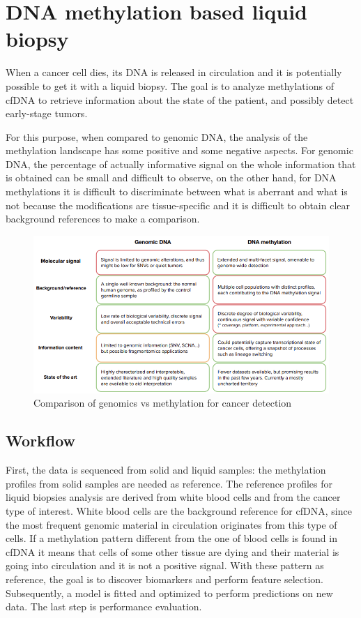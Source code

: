 \section{DNA methylation based liquid biopsy}

When a cancer cell dies, its DNA is released in circulation and it is
potentially possible to get it with a liquid biopsy. The goal is to analyze
methylations of cfDNA to retrieve information about the state of the patient,
and possibly detect early-stage tumors.

For this purpose, when compared to genomic DNA, the analysis of the methylation
landscape has some positive and some negative aspects. For genomic DNA, the
percentage of actually informative signal on the whole information that is
obtained can be small and difficult to observe, on the other hand, for DNA
methylations it is difficult to discriminate between what is aberrant and what
is not because the modifications are tissue-specific and it is difficult to
obtain clear background references to make a comparison.

\begin{figure}[!ht]
\centering
    \includegraphics[width=\linewidth]{comp.png}
    \caption{\label{fig:comp}Comparison of genomics vs methylation for cancer
    detection}
\end{figure}

\subsection{Workflow}

First, the data is sequenced from solid and liquid samples: the methylation
profiles from solid samples are needed as reference. The reference profiles for
liquid biopsies analysis are derived from white blood cells and from the cancer
type of interest. White blood cells are the background reference for cfDNA,
since the most frequent genomic material in circulation originates from this
type of cells. If a methylation pattern different from the one of blood cells is
found in cfDNA it means that cells of some other tissue are dying and their
material is going into circulation and it is not a positive signal. With these
pattern as reference, the goal is to discover biomarkers and perform feature
selection. Subsequently, a model is fitted and optimized to perform predictions
on new data. The last step is performance evaluation.

